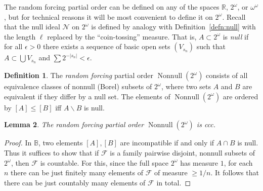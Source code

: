 \documentclass[11pt,oneside]{amsbook}
\newcommand{\RR}{\mathbb R}
\newcommand{\BB}{\mathbb B}
\newcommand{\Null}{\mathcal N}
\DeclareMathOperator{\Nonnull}{Nonnull}
\theoremstyle{definition}
\theoremstyle{plain}
\newtheorem{thm}{Theorem}[section]
\newtheorem{lem}[thm]{Lemma}
\theoremstyle{definition}
\newtheorem{defn}[thm]{Definition}
\theoremstyle{remark}
\begin{document}



The random forcing partial order can be defined on any of the spaces $\RR$, $2^\omega$, or $\omega^\omega$, but for technical reasons it will be most convenient to define it on $2^\omega$. Recall that the null ideal $\Null$ on $2^\omega$ is defined by analogy with Definition~\ref{defn:null} with the length $\ell$ replaced by the ``coin-tossing'' measure. That is, $A\subset2^\omega$ is \emph{null} if for all $\epsilon>0$ there exists a sequence of basic open sets $(V_{s_n})$ such that $A\subset\bigcup V_{s_n}$ and $\sum2^{-|s_n|}<\epsilon$.

\begin{defn}
  The \emph{random forcing} partial order $\Nonnull(2^\omega)$ consists of all equivalence classes of nonnull (Borel) subsets of $2^\omega$, where two sets $A$ and $B$ are equivalent if they differ by a null set. The elements of $\Nonnull(2^\omega)$ are ordered by $[A]\leq[B]$ iff $A\smallsetminus B$ is null.
\end{defn}

\begin{lem}
  \label{lem:random-ccc}
  The random forcing partial order $\Nonnull(2^\omega)$ is ccc.
\end{lem}

\begin{proof}
  In $\BB$, two elements $[A],[B]$ are incompatible if and only if $A\cap B$ is null. Thus it suffices to show that if $\mathcal F$ is a family pairwise disjoint, nonnull subsets of $2^\omega$, then $\mathcal F$ is countable. For this, since the full space $2^\omega$ has measure $1$, for each $n$ there can be just finitely many elements of $\mathcal F$ of measure $\geq1/n$. It follows that there can be just countably many elements of $\mathcal F$ in total.
\end{proof}
\end{document}
